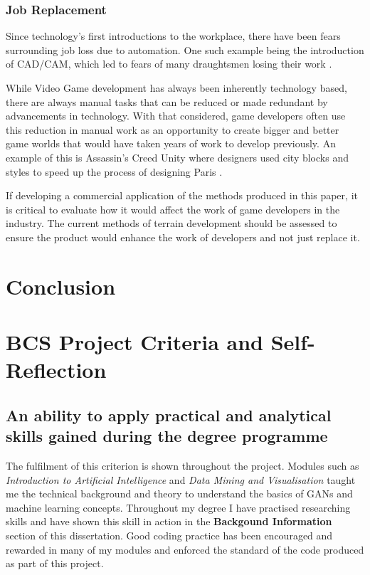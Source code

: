 \documentclass[a4paper]{report}
\begin{document}
\subsubsection{Job Replacement}
Since technology's first introductions to the workplace, there have been fears surrounding job loss due to automation. One such example being the introduction of CAD/CAM, which led to fears of many draughtsmen losing their work \cite{ToDo}.

While Video Game development has always been inherently technology based, there are always manual tasks that can be reduced or made redundant by advancements in technology. With that considered, game developers often use this reduction in manual work as an opportunity to create bigger and better game worlds that would have taken years of work to develop previously. An example of this is Assassin's Creed Unity where designers used city blocks and styles to speed up the process of designing Paris \cite{ign_2014}.

If developing a commercial application of the methods produced in this paper, it is critical to evaluate how it would affect the work of game developers in the industry. The current methods of terrain development should be assessed to ensure the product would enhance the work of developers and not just replace it.

\section{Conclusion}
\section{BCS Project Criteria and Self-Reflection}
\subsection{An ability to apply practical and analytical skills gained during the degree programme}
The fulfilment of this criterion is shown throughout the project. Modules such as \textit{Introduction to Artificial Intelligence} and \textit{Data Mining and Visualisation} taught me the technical background and theory to understand the basics of GANs and machine learning concepts. Throughout my degree I have practised researching skills and have shown this skill in action in the \textbf{Backgound Information} section of this dissertation. Good coding practice has been encouraged and rewarded in many of my modules and enforced the standard of the code produced as part of this project.
\end{document}
